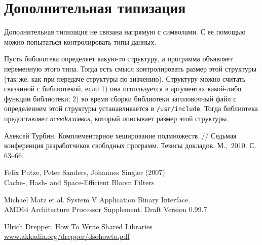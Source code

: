 \documentclass[russian,a4paper,12pt]{article}
\begin{document}
\section{Дополнительная типизация}
Дополнительная типизация не связана напрямую с символами.  С ее помощью можно попытаться
контролировать типы данных.

Пусть библиотека определяет какую-то структуру, а программа объявляет переменную этого типа.
Тогда есть смысл контролировать размер этой структуры (так же, как при передаче структуры
по значению).  Структуру можно считать связанной с библиотекой, если 1) она используется
в аргументах какой-либо функции библиотеки; 2) во время сборки библиотеки заголовочный
файл с определением этой структуры устанавливается в \verb|/usr/include|.  Тогда библиотека
предоставляет \textit{псевдосимвол}, который описывает размер этой структуры.

\begin{thebibliography}{9}

Алексей Турбин.  Комплементарное хеширование подмножеств~//
Седьмая конференция разработчиков свободных программ.
Тезисы докладов. М.,~2010. С.\,63--66.

Felix Putze, Peter Sanders, Johannes Singler (2007)\\
Cache-, Hash- and Space-Efficient Bloom Filters

Michael Matz et al.  System V Application Binary Interface.\\
AMD64 Architecture Processor Supplement.  Draft Version 0.99.7

Ulrich Drepper. How To Write Shared Libraries\\
\url{www.akkadia.org/drepper/dsohowto.pdf}

\end{thebibliography}
\end{document}
